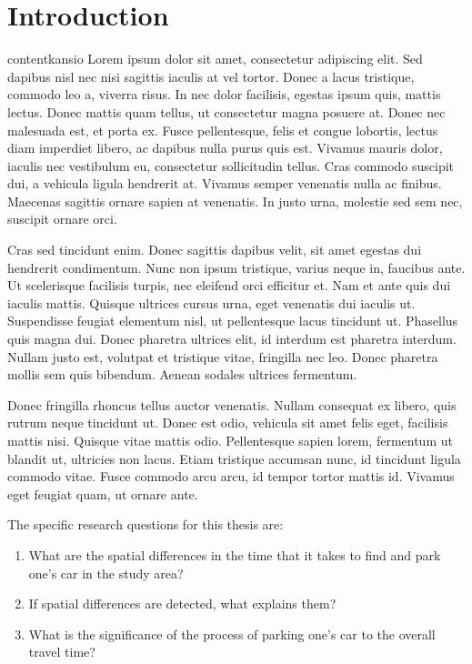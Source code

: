 \documentclass[../main.tex]{subfiles}
\begin{document}
\section{Introduction}
\justify
contentkansio Lorem ipsum dolor sit amet, consectetur adipiscing elit. Sed dapibus nisl nec nisi sagittis iaculis at vel tortor. Donec a lacus tristique, commodo leo a, viverra risus. In nec dolor facilisis, egestas ipsum quis, mattis lectus. Donec mattis quam tellus, ut consectetur magna posuere at. Donec nec malesuada est, et porta ex. Fusce pellentesque, felis et congue lobortis, lectus diam imperdiet libero, ac dapibus nulla purus quis est. Vivamus mauris dolor, iaculis nec vestibulum eu, consectetur sollicitudin tellus. Cras commodo suscipit dui, a vehicula ligula hendrerit at. Vivamus semper venenatis nulla ac finibus. Maecenas sagittis ornare sapien at venenatis. In justo urna, molestie sed sem nec, suscipit ornare orci.

Cras sed tincidunt enim. Donec sagittis dapibus velit, sit amet egestas dui hendrerit condimentum. Nunc non ipsum tristique, varius neque in, faucibus ante. Ut scelerisque facilisis turpis, nec eleifend orci efficitur et. Nam et ante quis dui iaculis mattis. Quisque ultrices cursus urna, eget venenatis dui iaculis ut. Suspendisse feugiat elementum nisl, ut pellentesque lacus tincidunt ut. Phasellus quis magna dui. Donec pharetra ultrices elit, id interdum est pharetra interdum. Nullam justo est, volutpat et tristique vitae, fringilla nec leo. Donec pharetra mollis sem quis bibendum. Aenean sodales ultrices fermentum.

Donec fringilla rhoncus tellus auctor venenatis. Nullam consequat ex libero, quis rutrum neque tincidunt ut. Donec est odio, vehicula sit amet felis eget, facilisis mattis nisi. Quisque vitae mattis odio. Pellentesque sapien lorem, fermentum ut blandit ut, ultricies non lacus. Etiam tristique accumsan nunc, id tincidunt ligula commodo vitae. Fusce commodo arcu arcu, id tempor tortor mattis id. Vivamus eget feugiat quam, ut ornare ante.

The specific research questions for this thesis are:

\begin{spacing}{1}
\begin{enumerate}[label=\Roman*] %
  \item What are the spatial differences in the time that it takes to find and park one’s car in the study area?
  \item If spatial differences are detected, what explains them?
  \item What is the significance of the process of parking one’s car to the overall travel time?
\end{enumerate}
\end{spacing}
\end{document}
